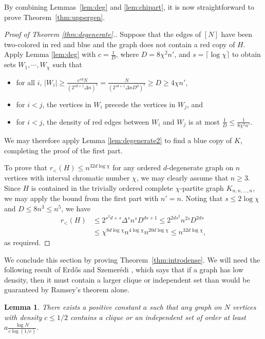 \documentclass[11pt]{article}
\newtheorem{lemma}[theorem]{Lemma}
\newcommand{\rord}{r_{<}}
\begin{document}
By combining Lemmas~\ref{lem:deg} and \ref{lem:chipart}, it is now straightforward to prove Theorem~\ref{thm:uppergen}.

\begin{proof}[Proof of Theorem \ref{thm:degenerate}.]
Suppose that the edges of $[N]$ have been two-colored in red and blue and the graph does not contain a red
copy of $H$. Apply Lemma \ref{lem:deg} with $c = \frac{1}{D}$, where $D = 8\chi^2 n'$,
and $s=\lceil\log \chi\rceil$ to obtain sets $W_{1},\cdots,W_{\chi}$
such that
\begin{itemize}
\item[(i)] 
for all $i$, $|W_{i}|\ge\frac{c^{sd} N}{(2^{sd+1} \Delta n)^{s}} = \frac{N}{\left(2^{s d+1} \Delta n D^{d}\right)^s} \ge D \geq 4 \chi n'$,

\item[(ii)] 
for $i<j$, the vertices in $W_{i}$ precede the vertices in $W_{j}$, and

\item[(iii)] 
for $i<j$, the density of red edges between $W_{i}$ and $W_{j}$ is at most $\frac{1}{D} \leq \frac{1}{8 \chi^2 n'}$.
\end{itemize}
We may therefore apply Lemma \ref{lem:degenerate2} to find a blue copy of $K$, completing the proof of the first part.

To prove that $\rord(H) \leq n^{32d \log \chi}$ for any ordered $d$-degenerate graph on $n$ vertices with interval chromatic number $\chi$, we may clearly assume that $n \geq 3$. Since $H$ is contained in the trivially ordered complete $\chi$-partite graph $K_{n,n, \dots, n}$, we may apply the bound from the first part with $n' = n$. Noting that $s \leq 2 \log \chi$ and $D \leq 8n^3 \leq n^5$, we have
\begin{align*}
\rord(H) & \leq 2^{s^2 d + s} \Delta^s n^s D^{ds + 1} \leq 2^{2 d s^2} n^{2s} D^{2ds}\\
& \leq \chi^{8 d \log \chi} n^{4 \log \chi} n^{20 d \log \chi} \leq n^{32 d \log \chi},
\end{align*}
as required.
\end{proof}

We conclude this section by proving Theorem~\ref{thm:introdense}. We will need the following result of Erd\H{o}s and Szemer\'edi \cite{ES72}, which says that if a graph has low density, then it must contain a larger clique or independent set than would be guaranteed by Ramsey's theorem alone.

\begin{lemma} \label{ErdosSzem}
There exists a positive constant $a$ such that any graph on $N$ vertices with density $c \leq 1/2$ contains a clique or an independent set of order at least $a \frac{\log N}{c \log (1/c)}$. 
\end{lemma}
\end{document}
